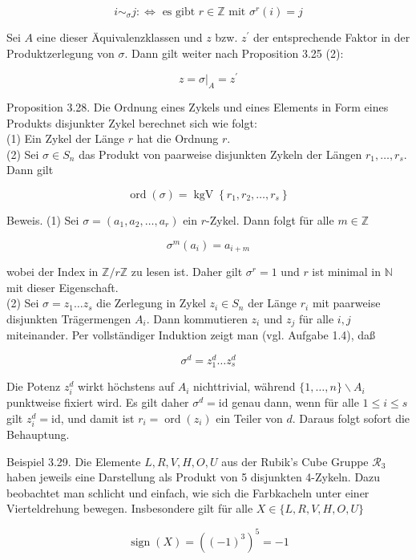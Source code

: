 \documentclass[10pt, letterpaper]{article}
\begin{document}
$$
i \sim_{\sigma} j: \Longleftrightarrow \text { es gibt } r \in \mathbb{Z} \text { mit } \sigma^{r}(i)=j
$$

Sei $A$ eine dieser Äquivalenzklassen und $z$ bzw. $z^{\prime}$ der entsprechende Faktor in der Produktzerlegung von $\sigma$. Dann gilt weiter nach Proposition 3.25 (2):

$$
z=\left.\sigma\right|_{A}=z^{\prime}
$$

Proposition 3.28. Die Ordnung eines Zykels und eines Elements in Form eines Produkts disjunkter Zykel berechnet sich wie folgt:\\
(1) Ein Zykel der Länge $r$ hat die Ordnung $r$.\\
(2) Sei $\sigma \in S_{n}$ das Produkt von paarweise disjunkten Zykeln der Längen $r_{1}, \ldots, r_{s}$. Dann gilt

$$
\operatorname{ord}(\sigma)=\operatorname{kgV}\left\{r_{1}, r_{2}, \ldots, r_{s}\right\}
$$

Beweis. (1) Sei $\sigma=\left(a_{1}, a_{2}, \ldots, a_{r}\right)$ ein $r$-Zykel. Dann folgt für alle $m \in \mathbb{Z}$

$$
\sigma^{m}\left(a_{i}\right)=a_{i+m}
$$

wobei der Index in $\mathbb{Z} / r \mathbb{Z}$ zu lesen ist. Daher gilt $\sigma^{r}=1$ und $r$ ist minimal in $\mathbb{N}$ mit dieser Eigenschaft.\\
(2) Sei $\sigma=z_{1} \ldots z_{s}$ die Zerlegung in Zykel $z_{i} \in S_{n}$ der Länge $r_{i}$ mit paarweise disjunkten Trägermengen $A_{i}$. Dann kommutieren $z_{i}$ und $z_{j}$ für alle $i, j$ miteinander. Per vollständiger Induktion zeigt man (vgl. Aufgabe 1.4), daß

$$
\sigma^{d}=z_{1}^{d} \ldots z_{s}^{d}
$$

Die Potenz $z_{i}^{d}$ wirkt höchstens auf $A_{i}$ nichttrivial, während $\{1, \ldots, n\} \backslash A_{i}$ punktweise fixiert wird. Es gilt daher $\sigma^{d}=\mathrm{id}$ genau dann, wenn für alle $1 \leq i \leq s$ gilt $z_{i}^{d}=\mathrm{id}$, und damit ist $r_{i}=\operatorname{ord}\left(z_{i}\right)$ ein Teiler von $d$. Daraus folgt sofort die Behauptung.

Beispiel 3.29. Die Elemente $L, R, V, H, O, U$ aus der Rubik's Cube Gruppe $\mathscr{R}_{3}$ haben jeweils eine Darstellung als Produkt von 5 disjunkten 4-Zykeln. Dazu beobachtet man schlicht und einfach, wie sich die Farbkacheln unter einer Vierteldrehung bewegen. Insbesondere gilt für alle $X \in\{L, R, V, H, O, U\}$

$$
\operatorname{sign}(X)=\left((-1)^{3}\right)^{5}=-1
$$
\end{document}
